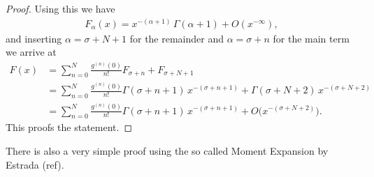 \begin{theorem}
\begin{proof}
        Using this we have
        \begin{align*}
            F_\alpha(x) = x^{-(\alpha+1)}\,\Gamma(\alpha + 1) + O(x^{-\infty}),
        \end{align*}
        and inserting $\alpha = \sigma + N + 1$ for the remainder and $\alpha =
        \sigma + n$ for the main term we arrive at
        \begin{align*}
            F(x) &= \sum_{n=0}^N \frac{g^{(n)}(0)}{n!} F_{\sigma+n} + F_{\sigma +
            N + 1} \\
            &= \sum_{n=0}^N \frac{g^{(n)}(0)}{n!}
                 \Gamma(\sigma + n +1)\,x^{-(\sigma + n + 1)} + \Gamma(\sigma +
                 N + 2)\,x^{-(\sigma + N + 2)} \\
            &= \sum_{n=0}^N \frac{g^{(n)}(0)}{n!}\Gamma(\sigma + n +
            1)\,x^{-(\sigma + n + 1)} + O\bigl(x^{-(\sigma + N + 2)}\bigr).
        \end{align*}
        This proofs the statement.
    \end{proof}
    \begin{remark}
        There is also a very simple proof using the so called Moment Expansion
        by Estrada (ref).
    \end{remark}
\end{theorem}
